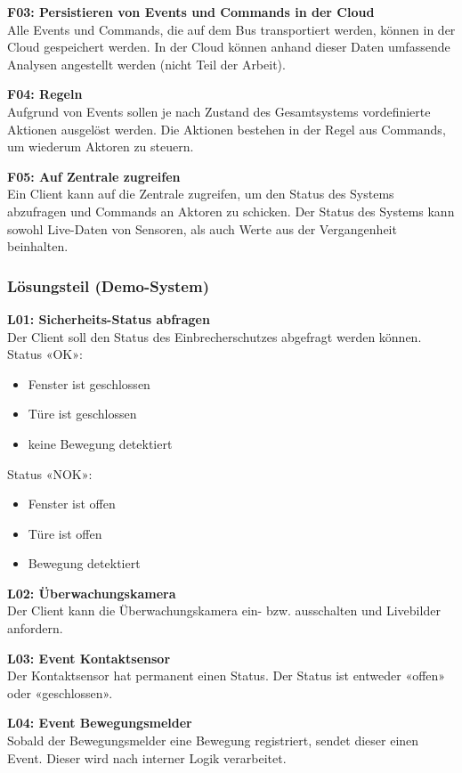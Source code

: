 \textbf{F03: Persistieren von Events und Commands in der Cloud} \\
Alle Events und Commands, die auf dem Bus transportiert werden, können in der Cloud gespeichert werden. In der Cloud können anhand dieser Daten umfassende Analysen angestellt werden (nicht Teil der Arbeit).

\textbf{F04: Regeln} \\
Aufgrund von Events sollen je nach Zustand des Gesamtsystems vordefinierte Aktionen ausgelöst werden. Die Aktionen bestehen in der Regel aus Commands, um wiederum Aktoren zu steuern.

\textbf{F05: Auf Zentrale zugreifen} \\
Ein Client kann auf die Zentrale zugreifen, um den Status des Systems abzufragen und Commands an Aktoren zu schicken. Der Status des Systems kann sowohl Live-Daten von Sensoren, als auch Werte aus der Vergangenheit beinhalten.

\subsubsection{Lösungsteil (Demo-System)}


\textbf{L01: Sicherheits-Status abfragen} \\
Der Client soll den Status des Einbrecherschutzes abgefragt werden können. \\
Status «OK»:
\begin{itemize}
	\item Fenster ist geschlossen
	\item Türe ist geschlossen
	\item keine Bewegung detektiert
\end{itemize}
Status «NOK»:
\begin{itemize}
	\item Fenster ist offen
	\item Türe ist offen
	\item Bewegung detektiert
\end{itemize}

\textbf{L02: Überwachungskamera} \\
Der Client kann die Überwachungskamera ein- bzw. ausschalten und Livebilder anfordern.

\textbf{L03: Event Kontaktsensor} \\
Der Kontaktsensor hat permanent einen Status. Der Status ist entweder «offen» oder «geschlossen».

\textbf{L04: Event Bewegungsmelder} \\
Sobald der Bewegungsmelder eine Bewegung registriert, sendet dieser einen Event. Dieser wird nach interner Logik verarbeitet.

